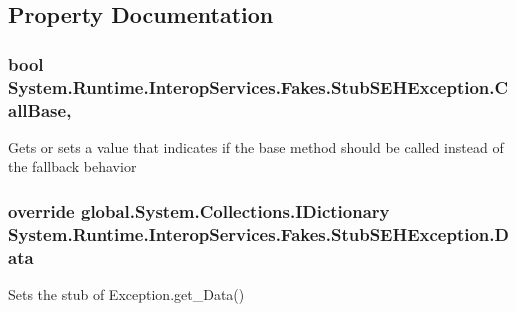 \subsection{Property Documentation}
\hypertarget{class_system_1_1_runtime_1_1_interop_services_1_1_fakes_1_1_stub_s_e_h_exception_a429485ec2f6c415bdc21f00cf97af3b7}{
\subsubsection[{Call\-Base}]{\setlength{\rightskip}{0pt plus 5cm}bool System.\-Runtime.\-Interop\-Services.\-Fakes.\-Stub\-S\-E\-H\-Exception.\-Call\-Base\hspace{0.3cm}{\ttfamily [get]}, {\ttfamily [set]}}}\label{class_system_1_1_runtime_1_1_interop_services_1_1_fakes_1_1_stub_s_e_h_exception_a429485ec2f6c415bdc21f00cf97af3b7}


Gets or sets a value that indicates if the base method should be called instead of the fallback behavior

\hypertarget{class_system_1_1_runtime_1_1_interop_services_1_1_fakes_1_1_stub_s_e_h_exception_a1440f449cb787c6909dcf2ef3e7c43db}{
\subsubsection[{Data}]{\setlength{\rightskip}{0pt plus 5cm}override global.\-System.\-Collections.\-I\-Dictionary System.\-Runtime.\-Interop\-Services.\-Fakes.\-Stub\-S\-E\-H\-Exception.\-Data\hspace{0.3cm}{\ttfamily [get]}}}\label{class_system_1_1_runtime_1_1_interop_services_1_1_fakes_1_1_stub_s_e_h_exception_a1440f449cb787c6909dcf2ef3e7c43db}


Sets the stub of Exception.\-get\-\_\-\-Data()

